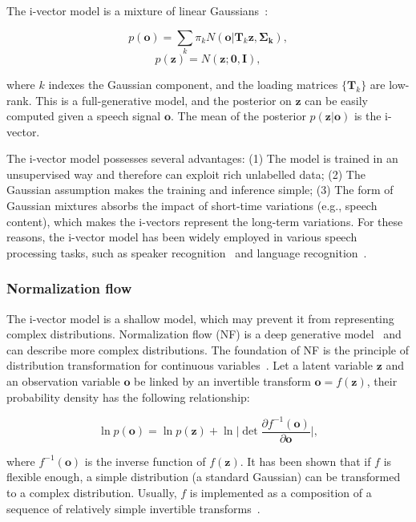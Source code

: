 \documentclass[a4paper]{article}
\begin{document}
The i-vector model is a mixture of linear Gaussians~\cite{dehak2011front}:

\[
 p(\mathbf{o}) = \sum_k \pi_k N(\mathbf{o}|\mathbf{T}_k \mathbf{z}, \pmb{\Sigma_k}),
\]
\[
 p(\mathbf{z}) = N(\mathbf{z}; \mathbf{0}, \mathbf{I}),
\]

\noindent  where $k$ indexes the Gaussian component, and the loading matrices $\{\mathbf{T}_k\}$ are low-rank.
This is a full-generative model, and the posterior on $\mathbf{z}$
can be easily computed given a speech signal $\mathbf{o}$. The mean of the posterior $p(\mathbf{z}|\mathbf{o})$ is the i-vector.

The i-vector model possesses several advantages: (1) The model is trained in an unsupervised way and therefore can exploit rich unlabelled data;
(2) The Gaussian assumption makes the training and inference simple; (3) The form of Gaussian mixtures absorbs the impact of
short-time variations (e.g., speech content), which makes the i-vectors represent the long-term variations.
For these reasons, the i-vector
model has been widely employed in various speech processing tasks, such as speaker recognition~\cite{dehak2011front} and
language recognition~\cite{dehak2011language,martinez2011language}.


\subsubsection{Normalization flow}

The i-vector model is a shallow model, which may prevent it from representing complex distributions.
Normalization flow (NF) is a deep generative model~\cite{papamakarios2019normalizing} and can describe more complex distributions.
The foundation of NF is the principle of distribution transformation for continuous variables~\cite{rudin2006real}.
Let a latent variable $\mathbf{z}$ and an observation variable $\mathbf{o}$ be linked by an invertible transform $\mathbf{o} = f(\mathbf{z})$, their probability density has the following relationship:

\[
\ln p(\mathbf{o}) = \ln p(\mathbf{z}) + \ln \Big | \det \frac{ \partial f^{-1}(\mathbf{o})}{\partial \mathbf{o}} \Big |,
\]

\noindent where $f^{-1}(\mathbf{o})$ is the inverse function of $f(\mathbf{z})$. It has been shown that if $f$ is flexible enough,
a simple distribution (a standard Gaussian) can be transformed to a complex distribution.
Usually, $f$ is implemented as a composition of a sequence of relatively simple invertible transforms~\cite{tabak2013family}.
\end{document}
